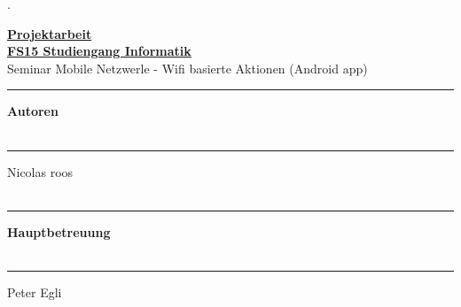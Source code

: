 \begin{titlepage}


\begin{minipage}[b]{0.117\textwidth}
\hskip 0.05cm
\end{minipage}
\begin{minipage}[b]{0.91\textwidth}
\begin{tiny}.\end{tiny}\vskip 2.8cm
	{\huge

	\textbf{\underline{Projektarbeit}}\\
	\textbf{\underline{FS15 Studiengang Informatik}}\\

	Seminar Mobile Netzwerle - Wifi basierte Aktionen (Android app)
	\vskip 0.5cm}

	\begin{minipage}[b]{0.27\textwidth}
	\hrule\vskip 0.5cm
		\textbf{Autoren}\\
		\\
	\end{minipage}
	\begin{minipage}[b]{0.03\textwidth}
	\hskip 0.5cm
	\end{minipage}
	\begin{minipage}[b]{0.7\textwidth}
	\hrule\vskip 0.5cm
		Nicolas roos\\
		\\
	\end{minipage}

	\begin{minipage}[b]{0.27\textwidth}
	\hrule\vskip 0.5cm
		\textbf{Hauptbetreuung}\\
		\\
	\end{minipage}
	\begin{minipage}[b]{0.03\textwidth}
	\hskip 0.5cm
	\end{minipage}
	\begin{minipage}[b]{0.7\textwidth}
	\hrule\vskip 0.5cm
		Peter Egli\\
		\\
	\end{minipage}



\end{minipage}
\end{titlepage}
